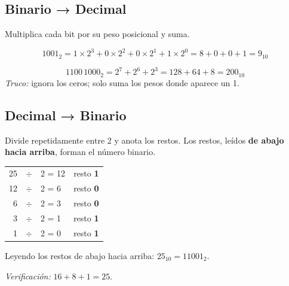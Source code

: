 \documentclass[12pt, oneside]{article}
\begin{document}
\subsection{Binario → Decimal}

Multiplica cada bit por su peso posicional y suma.

\begin{ejemplo}
\[
  1001_2
  = 1 \times 2^3 + 0 \times 2^2 + 0 \times 2^1 + 1 \times 2^0
  = 8 + 0 + 0 + 1
  = 9_{10}
\]
\end{ejemplo}

\begin{ejemplo}
\[
  1100\,1000_2
  = 2^7 + 2^6 + 2^3
  = 128 + 64 + 8
  = 200_{10}
\]
\textit{Truco:} ignora los ceros; solo suma los pesos donde aparece un 1.
\end{ejemplo}

\subsection{Decimal → Binario}

Divide repetidamente entre 2 y anota los restos.
Los restos, leídos \textbf{de abajo hacia arriba}, forman el número binario.

\begin{ejemplo}
\begin{center}
\begin{tabular}{r@{\;}c@{\;}l@{\quad}l}
  25 & $\div$ & 2 = 12 & resto \textbf{1} \\
  12 & $\div$ & 2 = 6  & resto \textbf{0} \\
   6 & $\div$ & 2 = 3  & resto \textbf{0} \\
   3 & $\div$ & 2 = 1  & resto \textbf{1} \\
   1 & $\div$ & 2 = 0  & resto \textbf{1} \\
\end{tabular}
\end{center}
Leyendo los restos de abajo hacia arriba: $25_{10} = 11001_2$.

\textit{Verificación:}
$16 + 8 + 1 = 25$. \checkmark
\end{ejemplo}
\end{document}
